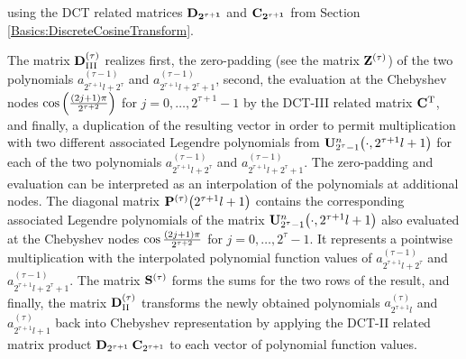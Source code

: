 using the DCT related matrices $\mathbf{D_{2^{\tau+1}}}$ and $\mathbf{C_{2^{\tau+1}}}$ from Section 
\ref{Basics:DiscreteCosineTransform}.

The matrix $\mathbf{D}^{(\tau)}_{\text{III}}$ realizes 
first, the zero-padding (see the matrix $\mathbf{Z}^{(\tau)}$) of the two polynomials $a^{(\tau-1)}_{2^{\tau+1}l+2^{\tau}}$ and 
$a^{(\tau-1)}_{2^{\tau+1}l+2^{\tau}+1}$, second, the evaluation at the Chebyshev nodes 
$\cos{\hspace{-0.4ex}}\left(\frac{(2j+1)\pi}{2^{\tau+2}}\right)$ for $j=0,\ldots,2^{\tau+1}-1$ by the DCT-III related matrix 
$\mathbf{C}^{\text{\rm{T}}}$, and finally, a duplication of the resulting vector in order to permit multiplication with two different 
associated Legendre polynomials from $\mathbf{U}_{2^{\tau}-1}^{n}{\hspace{-0.4ex}}\left(\cdot,2^{\tau+1}l+1\right)$ for each of the 
two polynomials $a^{(\tau-1)}_{2^{\tau+1}l+2^{\tau}}$ and 
$a^{(\tau-1)}_{2^{\tau+1}l+2^{\tau}+1}$. The zero-padding and evaluation can be interpreted as an interpolation of the 
polynomials at additional nodes. The diagonal matrix $\mathbf{P}^{(\tau)}{\hspace{-0.4ex}}\left(2^{\tau+1}l+1\right)$ 
contains the corresponding associated Legendre polynomials of the matrix $\mathbf{U}_{2^{\tau}-1}^n{\hspace{-0.4ex}}\left(\cdot,2^{\tau+1}l+1\right)$ 
also evaluated at the Chebyshev nodes $\cos\frac{\left(2j+1\right)\pi}{2^{\tau+2}}$ for $j=0,\ldots,2^{\tau}-1$. It represents 
a pointwise multiplication with the interpolated 
polynomial function values of $a^{(\tau-1)}_{2^{\tau+1}l+2^{\tau}}$ and $a^{(\tau-1)}_{2^{\tau+1}l+2^{\tau}+1}$. The matrix $\mathbf{S}^{(\tau)}$ 
forms the sums for the two rows of the result, and finally, the matrix $\mathbf{D}^{(\tau)}_{\text{II}}$ transforms the newly obtained 
polynomials $a^{(\tau)}_{2^{\tau+1}l}$ and $a^{(\tau)}_{2^{\tau+1}l+1}$ back into Chebyshev representation by applying the
DCT-II related matrix product $\mathbf{D}_{2^{\tau+1}} \: \mathbf{C}_{2^{\tau+1}}$ to each vector of polynomial function values.

